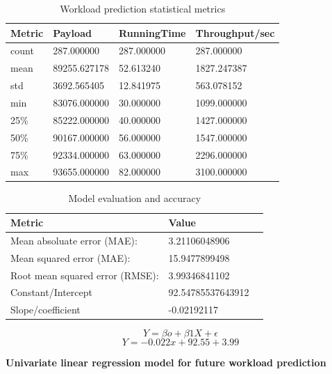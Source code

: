 \documentclass[12pt, letterpaper, titlepage]{report}
\begin{document}
\begin{table}[h!]
	\centering
	\begin{tabular}{|l|l|l|l|}
		\hline
		\textbf{Metric} & \textbf{Payload} & \textbf{RunningTime} & \textbf{Throughput/sec} \\ \hline
		
				count  &  287.000000 &  287.000000 &     287.000000 \\ \hline
				mean &  89255.627178 &   52.613240  &   1827.247387 \\ \hline
				std &    3692.565405 &   12.841975 &     563.078152 \\ \hline
				min &   83076.000000 &   30.000000  &   1099.000000 \\ \hline
				25\%  &  85222.000000  &  40.000000 &    1427.000000 \\ \hline
				50\%  &  90167.000000 &   56.000000 &    1547.000000 \\ \hline
				75\%  &  92334.000000 &   63.000000  &   2296.000000 \\ \hline
				max  &  93655.000000  &  82.000000   &  3100.000000 \\ \hline

	\end{tabular}
	\caption{Workload prediction statistical metrics}
	\label{workloadPredDesc}
\end{table}


\begin{table}[h!]
	\centering
	\begin{tabular}{|l|l|l|}
		\hline
		\textbf{Metric} & \textbf{Value} \\ \hline
		Mean absoluate error (MAE):  &  3.21106048906 \\ \hline
		Mean squared error (MAE):   &  15.9477899498 \\ \hline
		Root mean squared error (RMSE):   &  3.99346841102 \\ \hline
		Constant/Intercept  &  92.54785537643912 \\ \hline
		Slope/coefficient  &  -0.02192117\\ \hline
	\end{tabular}
	\caption{Model evaluation and accuracy}
	\label{regresModelEval100}
\end{table}
\pagebreak

$$ 
Y = \beta o + \beta1X + \epsilon 
$$
$$ 
Y = -0.022x + 92.55 + 3.99
$$

\begin{center}
 \textbf{Univariate linear regression model for future workload prediction}
\end{center}
\end{document}
